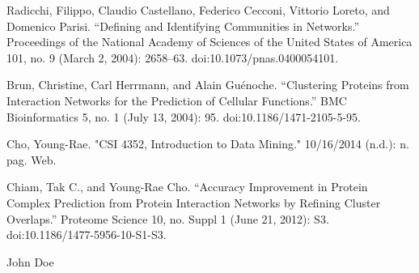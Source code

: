 \documentclass[journal]{IEEEtran}
\begin{document}

%
%
%
\begin{thebibliography}{1}
 
Radicchi, Filippo, Claudio Castellano, Federico Cecconi, Vittorio Loreto, and Domenico Parisi. “Defining and Identifying Communities in Networks.” Proceedings of the National Academy of Sciences of the United States of America 101, no. 9 (March 2, 2004): 2658–63. doi:10.1073/pnas.0400054101.

Brun, Christine, Carl Herrmann, and Alain Guénoche. “Clustering Proteins from Interaction Networks for the Prediction of Cellular Functions.” BMC Bioinformatics 5, no. 1 (July 13, 2004): 95. doi:10.1186/1471-2105-5-95.

 Cho, Young-Rae. "CSI 4352, Introduction to Data Mining." 10/16/2014 (n.d.): n. pag. Web.

 Chiam, Tak C., and Young-Rae Cho. “Accuracy Improvement in Protein Complex Prediction from Protein Interaction Networks by Refining Cluster Overlaps.” Proteome Science 10, no. Suppl 1 (June 21, 2012): S3. doi:10.1186/1477-5956-10-S1-S3.

\end{thebibliography}

% 

\begin{IEEEbiography}{John Doe}
\blindtext
\end{IEEEbiography}
\end{document}
